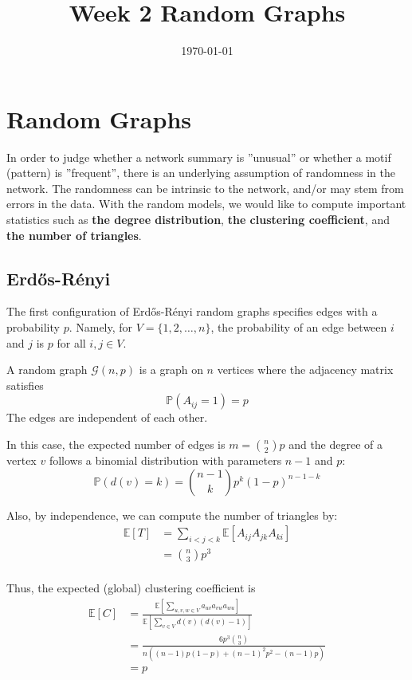 \documentclass{article}
\title{Week 2 Random Graphs}
\date{\today}
\begin{document}
\maketitle

\section{Random Graphs}
In order to judge whether a network summary is ”unusual” or whether a motif (pattern) is ”frequent”, there is an underlying assumption of randomness in the network. The randomness can be intrinsic to the network, and/or may stem from errors in the data. With the random models, we would like to compute important statistics such as \textbf{the degree distribution}, \textbf{the clustering coefficient}, and \textbf{the number of triangles}.

\subsection{Erd\H{o}s-R\'{e}nyi}
The first configuration of Erd\H{o}s-R\'{e}nyi random graphs specifies edges with a probability $p$. Namely, for $V=\{1,2,\ldots,n\}$, the probability of an edge between $i$ and $j$ is $p$ for all $i,j\in V$.
\begin{definition}
    A random graph $\mathcal{G}(n,p)$ is a graph on $n$ vertices where the adjacency matrix satisfies
    \begin{equation*}
        \mathbb{P}(A_{ij}=1)=p
    \end{equation*}
    The edges are independent of each other.
\end{definition}

In this case, the expected number of edges is $m=\binom{n}{2}p$ and the degree of a vertex $v$ follows a binomial distribution with parameters $n-1$ and $p$:
$$
\mathbb{P}(d(v)=k)=\binom{n-1}{k}p^k(1-p)^{n-1-k}
$$

Also, by independence, we can compute the number of triangles by:
\begin{align*}
    \mathbb{E}[T]&=\sum_{i<j<k} \mathbb{E}[A_{ij}A_{jk}A_{ki}]\\
    &=\binom{n}{3}p^3\\
\end{align*}

Thus, the expected (global) clustering coefficient is
\begin{align*}
    \mathbb{E}[C]&=\frac{\mathbb{E}[\sum_{u,v,w \in V} a_{uv}a_{vw}a_{wu}]}{\mathbb{E}[\sum_{v\in V} d(v)(d(v)-1)]} \\
    &= \frac{6p^3 \binom{n}{3}}{n ((n-1)p(1-p) + (n-1)^2p^2 -(n-1)p)}\\
    &=p
\end{align*}
\end{document}

